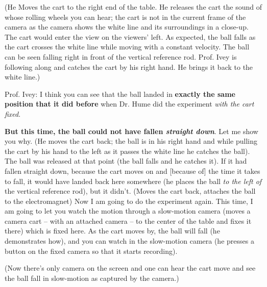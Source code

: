 \documentclass[a6paper]{article}
\begin{document}
(He Moves the cart to the right end of the table. He releases the cart the sound of whose rolling wheels you can hear; the cart is not in the current frame of the camera as the camera shows the white line and its surroundings in a close-up. The cart would enter the view on the viewers' left. As expected, the ball falls as the cart crosses the white line while moving with a constant velocity. The ball can be seen falling right in front of the vertical reference rod. Prof. Ivey is following along and catches the cart by his right hand. He brings it back to the white line.)

Prof. Ivey: I think you can see that the ball landed in \textbf{exactly the same position that it did before} when Dr. Hume did the experiment \emph{with the cart fixed}.

\textbf{But this time, the ball could not have fallen \emph{straight down}}. Let me show you why. (He moves the cart back; the ball is in his right hand and while pulling the cart by his hand to the left as it passes the white line he catches the ball). The ball was released at that point (the ball falls and he catches it). If it had fallen straight down, because the cart moves on and [because of] the time it takes to fall, it would have landed back here somewhere (he places the ball \emph{to the left of} the vertical reference rod), but it didn't. (Moves the cart back, attaches the ball to the electromagnet) Now I am going to do the experiment again. This time, I am going to let you watch the motion through a slow-motion camera (moves a camera cart -- with an attached camera -- to the center of the table and fixes it there) which is fixed here. As the cart moves by, the ball will fall (he demonstrates how), and you can watch in the slow-motion camera (he presses a button on the fixed camera so that it starts recording).

(Now there's only camera on the screen and one can hear the cart move and see the ball fall in slow-motion as captured by the camera.)
\end{document}
